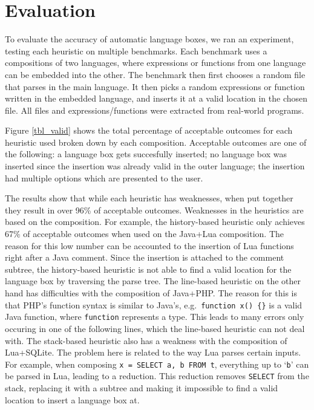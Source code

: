 \documentclass[sigplan,screen]{acmart}\settopmatter{printfolios=true,printccs=false,printacmref=false}
\begin{document}
\section{Evaluation}

To evaluate the accuracy of automatic language boxes, we ran an experiment,
testing each heuristic on multiple benchmarks. Each benchmark uses a
compositions of two languages, where expressions or functions from one language
can be embedded into the other. The benchmark then first chooses a random file
that parses in the main language. It then picks a random expressions or
function written in the embedded language, and inserts it at a valid location
in the chosen file. All files and expressions/functions were extracted from
real-world programs.

Figure \ref{tbl_valid} shows the total percentage of
acceptable outcomes for each heuristic used broken down by each composition.
Acceptable outcomes are one of the following: a language box gets succesfully
inserted; no language box was inserted since the insertion was already valid in
the outer language; the insertion had multiple options which are presented to
the user.

The results show that while each heuristic has weaknesses, when put together
they result in over 96\% of acceptable outcomes. Weaknesses in the heuristics
are based on the composition. For example, the history-based heuristic only
achieves 67\% of acceptable outcomes when used on the Java+Lua composition. The
reason for this low number can be accounted to the insertion of Lua functions
right after a Java comment.  Since the insertion is attached to the comment
subtree, the history-based heuristic is not able to find a valid location for
the language box by traversing the parse tree.  The line-based heuristic on the
other hand has difficulties with the composition of Java+PHP. The reason for
this is that PHP's function syntax is similar to Java's, e.g.~\texttt{function
x() \{\}} is a valid Java function, where \texttt{function} represents a type.
This leads to many errors only occuring in one of the following lines, which
the line-based heuristic can not deal with. The stack-based heuristic also has
a weakness with the composition of Lua+SQLite. The problem here is related to
the way Lua parses certain inputs. For example, when composing \texttt{x =
SELECT a, b FROM t}, everything up to `\texttt{b}' can be parsed in Lua,
leading to a reduction. This reduction removes \texttt{SELECT} from the stack,
replacing it with a subtree and making it impossible to find a valid location
to insert a language box at.
\end{document}
